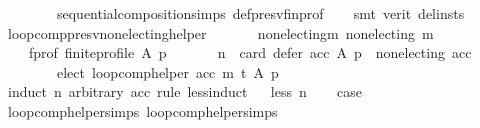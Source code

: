 \begin{isabellebody}
\ \ \ \ \ \ \ \ sequential{\isacharunderscore}{\kern0pt}composition{\isachardot}{\kern0pt}simps\ def{\isacharunderscore}{\kern0pt}presv{\isacharunderscore}{\kern0pt}fin{\isacharunderscore}{\kern0pt}prof\isanewline
\ \ \isamarkupfalse%
\ {\isacharparenleft}{\kern0pt}smt\ {\isacharparenleft}{\kern0pt}verit{\isacharcomma}{\kern0pt}\ del{\isacharunderscore}{\kern0pt}insts{\isacharparenright}{\kern0pt}{\isacharparenright}{\kern0pt}%
\endisatagproof
{\isafoldproof}%
%
\isadelimproof
\isanewline
%
\endisadelimproof
\isanewline
{}\isamarkupfalse%
\ loop{\isacharunderscore}{\kern0pt}comp{\isacharunderscore}{\kern0pt}presv{\isacharunderscore}{\kern0pt}non{\isacharunderscore}{\kern0pt}electing{\isacharunderscore}{\kern0pt}helper{\isacharcolon}{\kern0pt}\isanewline
\ \ \isanewline
\ \ \ \ non{\isacharunderscore}{\kern0pt}electing{\isacharunderscore}{\kern0pt}m{\isacharcolon}{\kern0pt}\ {\isachardoublequoteopen}non{\isacharunderscore}{\kern0pt}electing\ m{\isachardoublequoteclose}\ \isanewline
\ \ \ \ f{\isacharunderscore}{\kern0pt}prof{\isacharcolon}{\kern0pt}\ {\isachardoublequoteopen}finite{\isacharunderscore}{\kern0pt}profile\ A\ p{\isachardoublequoteclose}\isanewline
\ \ \isanewline
\ \ \ \ {\isachardoublequoteopen}{\isacharparenleft}{\kern0pt}n\ {\isacharequal}{\kern0pt}\ card\ {\isacharparenleft}{\kern0pt}defer\ acc\ A\ p{\isacharparenright}{\kern0pt}\ {\isasymand}\ non{\isacharunderscore}{\kern0pt}electing\ acc{\isacharparenright}{\kern0pt}\ {\isasymLongrightarrow}\isanewline
\ \ \ \ \ \ \ \ elect\ {\isacharparenleft}{\kern0pt}loop{\isacharunderscore}{\kern0pt}comp{\isacharunderscore}{\kern0pt}helper\ acc\ m\ t{\isacharparenright}{\kern0pt}\ A\ p\ {\isacharequal}{\kern0pt}\ {\isacharbraceleft}{\kern0pt}{\isacharbraceright}{\kern0pt}{\isachardoublequoteclose}\isanewline
%
\isadelimproof
%
\endisadelimproof
%
\isatagproof
{}\isamarkupfalse%
\ {\isacharparenleft}{\kern0pt}induct\ n\ arbitrary{\isacharcolon}{\kern0pt}\ acc\ rule{\isacharcolon}{\kern0pt}\ less{\isacharunderscore}{\kern0pt}induct{\isacharparenright}{\kern0pt}\isanewline
\ \ \isamarkupfalse%
{\isacharparenleft}{\kern0pt}less\ n{\isacharparenright}{\kern0pt}\isanewline
\ \ \isamarkupfalse%
\ {\isacharquery}{\kern0pt}case\isanewline
\ \ \ \ \isamarkupfalse%
\ loop{\isacharunderscore}{\kern0pt}comp{\isacharunderscore}{\kern0pt}helper{\isachardot}{\kern0pt}simps{\isacharparenleft}{\kern0pt}{}{\isacharparenright}{\kern0pt}\ loop{\isacharunderscore}{\kern0pt}comp{\isacharunderscore}{\kern0pt}helper{\isachardot}{\kern0pt}simps{\isacharparenleft}{\kern0pt}{}{\isacharparenright}{\kern0pt}\isanewline

\end{isabellebody}

